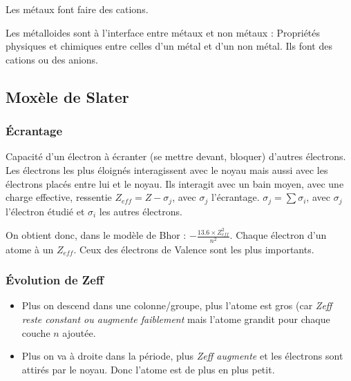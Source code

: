 \documentclass[french]{yLectureNote}
\begin{document}
Les métaux font faire des cations.

Les métalloides sont à l'interface entre métaux et non métaux : Propriétés physiques et chimiques entre celles d'un métal et d'un non métal. Ils font des cations ou des anions.


\subsection{Moxèle de Slater}
\subsubsection{Écrantage}
\begin{theorem}
Capacité d'un électron à écranter (se mettre devant, bloquer) d'autres électrons. Les électrons les plus éloignés interagissent avec le noyau mais aussi avec les électrons placés entre lui et le noyau. Ils interagit avec un bain moyen, avec une charge effective, ressentie $Z_{eff} = Z-\sigma_j$, avec $\sigma_j$ l'écrantage.
$\sigma_j = \sum \sigma_i$, avec $\sigma_j$ l'électron étudié et $\sigma_i$ les autres électrons.
\end{theorem}
On obtient donc, dans le modèle de Bhor : $-\frac{13.6\times Z_{eff}^2}{n^2}$.
Chaque électron d'un atome à un $Z_{eff}$. Ceux des électrons de Valence sont les plus importants.
\subsubsection{Évolution de Zeff}
\begin{itemize}
 \item Plus on descend dans une colonne/groupe, plus l'atome est gros (car \emph{Zeff reste constant ou augmente faiblement} mais l'atome grandit pour chaque couche $n$ ajoutée.
 \item Plus on va à droite dans la période, plus \emph{Zeff augmente} et les électrons sont attirés par le noyau. Donc l'atome est de plus en plus petit.
\end{itemize}
\end{document}
